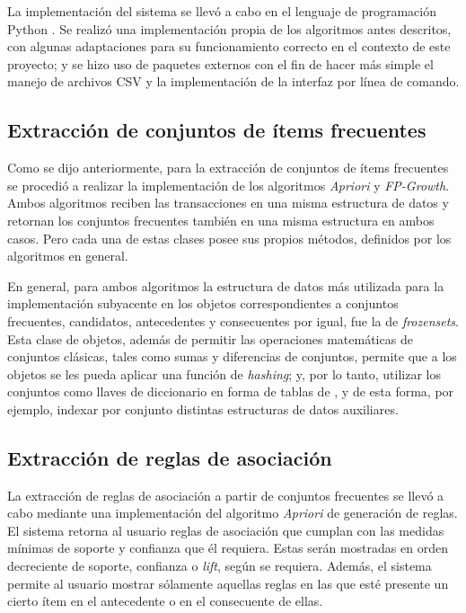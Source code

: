 La implementación del sistema se llevó a cabo en el lenguaje de programación Python \cite{python.org}. Se realizó una implementación propia de los algoritmos antes descritos, con algunas adaptaciones para su funcionamiento correcto en el contexto de este proyecto; y se hizo uso de paquetes externos con el fin de hacer más simple el manejo de archivos CSV y la implementación de la interfaz por línea de comando.

\subsection{Extracción de conjuntos de ítems frecuentes}

Como se dijo anteriormente, para la extracción de conjuntos de ítems frecuentes se procedió a realizar la implementación de los algoritmos \textit{Apriori} y \textit{FP-Growth}. Ambos algoritmos reciben las transacciones en una misma estructura de datos y retornan los conjuntos frecuentes también en una misma estructura en ambos casos. Pero cada una de estas clases posee sus propios métodos, definidos por los algoritmos en general.

En general, para ambos algoritmos la estructura de datos más utilizada para la implementación subyacente en los objetos correspondientes a conjuntos frecuentes, candidatos, antecedentes y consecuentes por igual, fue la de \textit{frozensets}. Esta clase de objetos, además de permitir las operaciones matemáticas de conjuntos clásicas, tales como sumas y diferencias de conjuntos, permite que a los objetos se les pueda aplicar una función de \textit{hashing}; y, por lo tanto, utilizar los conjuntos como llaves de diccionario en forma de tablas de , y de esta forma, por ejemplo, indexar por conjunto distintas estructuras de datos auxiliares.

\subsection{Extracción de reglas de asociación}

La extracción de reglas de asociación a partir de conjuntos frecuentes se llevó a cabo mediante una implementación del algoritmo \textit{Apriori} de generación de reglas. El sistema retorna al usuario reglas de asociación que cumplan con las medidas mínimas de soporte y confianza que él requiera. Estas serán mostradas en orden decreciente de soporte, confianza o \textit{lift}, según se requiera. Además, el sistema permite al usuario mostrar sólamente aquellas reglas en las que esté presente un cierto ítem en el antecedente o en el consecuente de ellas.

